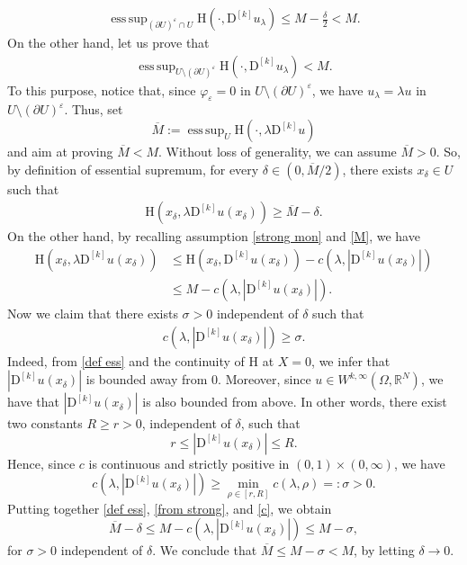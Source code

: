 \documentclass[a4paper,11pt]{article}
\numberwithin{equation}{section}
\newcommand{\numberset}{\mathbb}
\newcommand{\eps}{\varepsilon}
\newcommand{\Om}{\Omega}
\newcommand{\R}{\numberset{R}}
\newcommand{\rom}{\mathrm}
\DeclareMathOperator*{\esssup}{ess\,sup}
\theoremstyle{definition}
\begin{document}
\begin{align}\label{first key}
\esssup_{(\partial U)^\eps\cap U}\rom{H}(\cdot, \mathrm D^{[k]}u_\lambda)\leq M-\frac{\delta}{2}<M.
\end{align}
On the other hand, let us prove that
\begin{align}\label{second key}
\esssup_{U\setminus (\partial U)^\eps}\rom{H}(\cdot, \mathrm D^{[k]}u_\lambda)<M.
\end{align}
To this purpose, notice that, since $\varphi_\eps=0$ in $U\setminus (\partial U)^\eps$, we have $u_\lambda=\lambda u$ in $U\setminus (\partial U)^\eps$. Thus, set $$\overline M:=\esssup_U \rom{H}(\cdot, \lambda \mathrm D^{[k]}u)$$ and aim at proving $\overline M<M$. Without loss of generality, we can assume $\overline M>0$. So, by definition of essential supremum, for every $\delta\in (0,\overline M/2)$, there exists $x_\delta\in U$ such that
\begin{align}\label{def ess}
 \rom{H}(x_\delta,\lambda \mathrm{D}^{[k]}u(x_\delta))\geq\overline M-\delta.
\end{align}
On the other hand, by recalling assumption \eqref{strong mon} and \eqref{M}, we have
\begin{align}
 \rom{H}(x_\delta,\lambda \mathrm{D}^{[k]}u(x_\delta))&\leq \rom{H}(x_\delta, \mathrm{D}^{[k]}u(x_\delta))-c(\lambda, |\mathrm D^{[k]}u(x_\delta)|)\nonumber\\
&\leq M-c(\lambda, |\mathrm D^{[k]}u(x_\delta)|).\label{from strong}
\end{align}
Now we claim that there exists $\sigma>0$ independent of $\delta$ such that
\begin{align}\label{c}
c(\lambda,|\mathrm D^{[k]}u(x_\delta)|)\geq\sigma.
\end{align}
Indeed, from \eqref{def ess} and the continuity of $\rom{H}$ at $X=0$, we infer that $|\mathrm D^{[k]}u(x_\delta)|$ is bounded away from $0$. Moreover, since $u\in W^{k,\infty}(\Om,\R^N)$, we have that $|\mathrm D^{[k]}u(x_\delta)|$ is also bounded from above. In other words, there exist two constants $R\geq r>0$, independent of $\delta$, such that
$$
r\leq| \mathrm D^{[k]}u(x_\delta)|\leq R.
$$
Hence, since $c$ is continuous and strictly positive in $(0,1)\times(0,\infty)$, we have $$c(\lambda,| \mathrm D^{[k]}u(x_\delta)|)\geq\min_{\rho\in[r,R]}c(\lambda,\rho)=:\sigma>0.$$
Putting together \eqref{def ess}, \eqref{from strong}, and \eqref{c}, we obtain
$$
\overline M-\delta\leq M-c(\lambda, |\mathrm D^{[k]}u(x_\delta)|)\leq M-\sigma,
$$
for $\sigma>0$ independent of $\delta$. We conclude that $\overline M\leq M-\sigma<M$, by letting $\delta\to 0$.\\
\end{document}

